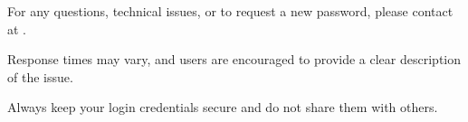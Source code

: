 

For any questions, technical issues, or to request a new password, please contact \textsl{\prjContact} at \prjGuaix. 

Response times may vary, and users are encouraged to provide a clear description of the issue. 

\warning Always keep your login credentials secure and do not share them with others.